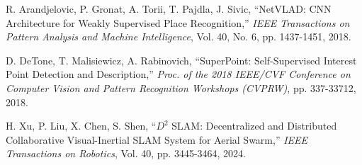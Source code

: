 \documentclass[a4paper,fleqn,10pt,twocolumn]{SICE_ISCS}
\begin{document}
\begin{thebibliography}{9}
R. Arandjelovic, P. Gronat, A. Torii, T. Pajdla, J. Sivic, ``NetVLAD: CNN Architecture for Weakly Supervised Place Recognition,'' {\it IEEE Transactions on Pattern Analysis and Machine Intelligence}, Vol. 40, No. 6, pp. 1437-1451, 2018.

D. DeTone, T. Malisiewicz, A. Rabinovich, ``SuperPoint: Self-Supervised Interest Point Detection and Description,'' {\it Proc. of the 2018 IEEE/CVF Conference on Computer Vision and Pattern Recognition Workshops (CVPRW)}, pp. 337-33712, 2018.

H. Xu, P. Liu, X. Chen, S. Shen, ``$D^{2}$ SLAM: Decentralized and Distributed Collaborative Visual-Inertial SLAM System for Aerial Swarm,'' {\it IEEE Transactions on Robotics}, Vol. 40, pp. 3445-3464, 2024.
\end{thebibliography}
\end{document}
